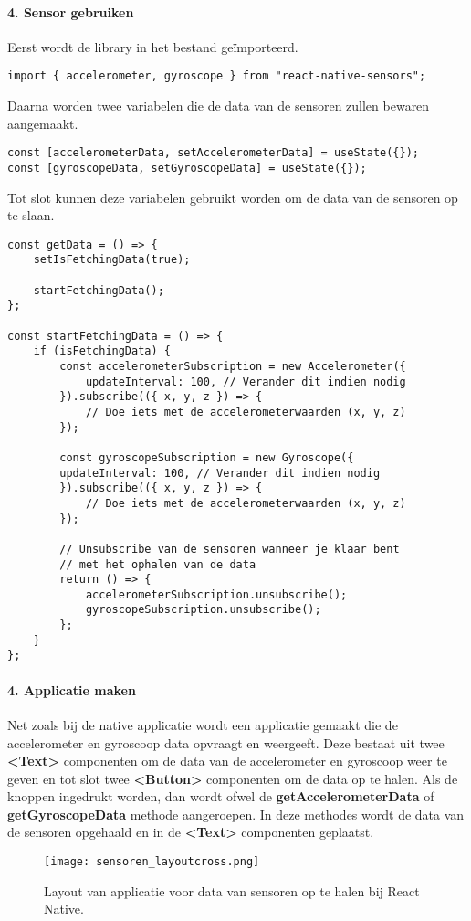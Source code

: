 \paragraph{4. Sensor gebruiken}
Eerst wordt de library in het bestand geïmporteerd.
\begin{verbatim}
import { accelerometer, gyroscope } from "react-native-sensors";
\end{verbatim}
Daarna worden twee variabelen die de data van de sensoren zullen bewaren aangemaakt.
\begin{verbatim}
const [accelerometerData, setAccelerometerData] = useState({});
const [gyroscopeData, setGyroscopeData] = useState({});
\end{verbatim}
Tot slot kunnen deze variabelen gebruikt worden om de data van de sensoren op te slaan.
\begin{verbatim}
const getData = () => {
    setIsFetchingData(true);

    startFetchingData();
};

const startFetchingData = () => {
    if (isFetchingData) {
        const accelerometerSubscription = new Accelerometer({
            updateInterval: 100, // Verander dit indien nodig
        }).subscribe(({ x, y, z }) => {
            // Doe iets met de accelerometerwaarden (x, y, z)
        });

        const gyroscopeSubscription = new Gyroscope({
        updateInterval: 100, // Verander dit indien nodig
        }).subscribe(({ x, y, z }) => {
            // Doe iets met de accelerometerwaarden (x, y, z)
        });

        // Unsubscribe van de sensoren wanneer je klaar bent 
        // met het ophalen van de data
        return () => {
            accelerometerSubscription.unsubscribe();
            gyroscopeSubscription.unsubscribe();
        };
    }
};
\end{verbatim}

\paragraph{4. Applicatie maken}
Net zoals bij de native applicatie wordt een applicatie gemaakt die de accelerometer en gyroscoop data 
opvraagt en weergeeft. Deze bestaat uit twee \textbf{<Text>} componenten om de data van de
accelerometer en gyroscoop weer te geven en tot slot twee \textbf{<Button>} componenten om de 
data op te halen. Als de knoppen ingedrukt worden, dan wordt ofwel de
\textbf{getAccelerometerData} of \textbf{getGyroscopeData} methode aangeroepen. In deze methodes wordt de data 
van de sensoren opgehaald en in de \textbf{<Text>} componenten geplaatst.
\begin{figure}[H]
    \centering
    \texttt{[image: sensoren\_layoutcross.png]}
    \caption{Layout van applicatie voor data van sensoren op te halen bij React Native.}
\end{figure}
